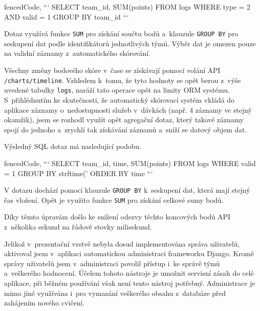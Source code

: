 \documentclass[
  digital,
  twoside,
  table, 
  nolof, 
  nolot
]{fithesis3}
\begin{document}
\begin{markdown*}{%
  fencedCode,
}
```
SELECT team_id, SUM(points) FROM logs 
WHERE type = 2 AND valid = 1 
GROUP BY team_id
```
\end{markdown*}

Dotaz využívá funkce \texttt{SUM} pro získání součtu bodů a~klauzule \texttt{GROUP\ BY} pro seskupení dat podle identifikátorů jednotlivých týmů. Výběr dat je omezen pouze na validní záznamy z~automatického skórování.

Všechny změny bodového skóre v~čase se získávají pomocí volání API \texttt{/charts/timeline}. Vzhledem k~tomu, že tyto hodnoty se opět berou z~výše uvedené tabulky \texttt{logs}, naráží tato operace opět na limity ORM systému. S~přihlédnutím ke skutečnosti, že automatický skórovací systém vkládá do aplikace záznamy o~nedostupnosti služeb v~dávkách (např. 4 záznamy ve stejný okamžik), jsem se rozhodl využít opět agregační dotaz, který takové záznamy spojí do jednoho a~zrychlí tak získávání záznamů a~sníží se datový objem dat.

Výsledný SQL dotaz má nasledující podobu.

\begin{markdown*}{%
  fencedCode,
}
```
SELECT team_id, time, SUM(points) FROM logs 
WHERE valid = 1 
GROUP BY strftime('%
ORDER BY time
```
\end{markdown*}

V dotazu dochází pomocí klauzule \texttt{GROUP\ BY} k~seskupení dat, která mají stejný čas vložení. Opět je využito funkce \texttt{SUM} pro získání celkové sumy bodů.

Díky těmto úpravám došlo ke snížení odezvy těchto koncových bodů API z~několika sekund na řádově stovky milisekund. 

Jelikož v~prezentační vrstvě nebyla dosud implementována správa uživatelů, aktivoval jsem v~aplikaci automatickou administraci frameworku Django. Kromě správy uživatelů jsem v~administraci povolil přístup i~ke správě týmů a~veškerého hodnocení. Účelem tohoto nástroje je umožnit servisní zásah do celé aplikace, při běžném používání však není tento nástroj potřebný. Administrace je mimo jiné využívána i~pro vymazání veškerého obsahu z~databáze před zahájením nového cvičení.
\end{document}
